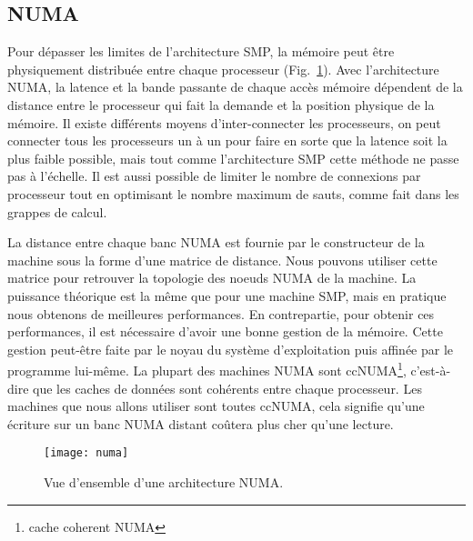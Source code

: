 \subsection{NUMA}
Pour dépasser les limites de l'architecture SMP, la mémoire peut être physiquement distribuée entre chaque processeur (Fig.~\ref{fig:numa}).
%
Avec l'architecture NUMA, la latence et la bande passante de chaque accès mémoire dépendent de la distance entre le processeur qui fait la demande et la position physique de la mémoire.
%
Il existe différents moyens d'inter-connecter les processeurs, on peut connecter tous les processeurs un à un pour faire en sorte que la latence soit la plus faible possible, mais tout comme l'architecture SMP cette méthode ne passe pas à l'échelle.
%
Il est aussi possible de limiter le nombre de connexions par processeur tout en optimisant le nombre maximum de sauts, comme fait dans les grappes de calcul.

La distance entre chaque banc NUMA est fournie par le constructeur de la machine sous la forme d'une matrice de distance.
%
Nous pouvons utiliser cette matrice pour retrouver la topologie des noeuds NUMA de la machine.
%
La puissance théorique est la même que pour une machine SMP, mais en pratique nous obtenons de meilleures performances.
%
En contrepartie, pour obtenir ces performances, il est nécessaire d'avoir une bonne gestion de la mémoire.
%
Cette gestion peut-être faite par le noyau du système d'exploitation puis affinée par le programme lui-même.
%
La plupart des machines NUMA sont ccNUMA\footnote{cache coherent NUMA}, c'est-à-dire que les caches de données sont cohérents entre chaque processeur.
%
Les machines que nous allons utiliser sont toutes ccNUMA, cela signifie qu'une écriture sur un banc NUMA distant coûtera plus cher qu'une lecture.

\begin{figure}[!h]
  \centering
  \texttt{[image: numa]}
  \caption{Vue d'ensemble d'une architecture NUMA.}
  \label{fig:numa}
\end{figure}
